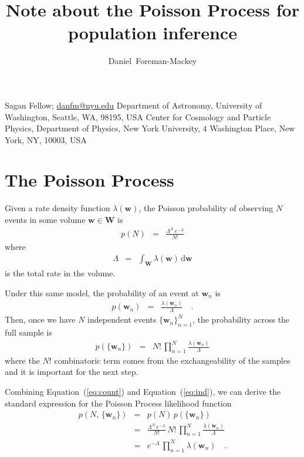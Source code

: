 \documentclass[12pt,preprint]{aastex}
\newcommand{\Eq}[1]{Equation~(\ref{eq:#1})}
\newcommand{\eq}[1]{\Eq{#1}}
\newcommand{\eqlabel}[1]{\label{eq:#1}}
\newcommand{\dd}{\ensuremath{\,\mathrm{d}}}
\newcommand{\bvec}[1]{\ensuremath{\boldsymbol{#1}}}
\newcommand{\rate}{\ensuremath{\lambda}}
\newcommand{\intrate}{\ensuremath{\Lambda}}
\begin{document}
\title{%
    Note about the Poisson Process for population inference
}

\newcommand{\uw}{2}
\newcommand{\nyu}{3}
\author{%
    Daniel~Foreman-Mackey\altaffilmark{1,\uw,\nyu}
}
         {Sagan Fellow; \url{danfm@nyu.edu}}
\altaffiltext{\uw}       {Department of Astronomy, University of Washington,
                          Seattle, WA, 98195, USA}
\altaffiltext{\nyu}      {Center for Cosmology and Particle Physics,
                          Department of Physics, New York University,
                          4 Washington Place, New York, NY, 10003, USA}

\section{The Poisson Process}

Given a rate density function $\rate(\bvec{w})$, the Poisson probability of
observing $N$ events in some volume $\bvec{w} \in \bvec{W}$ is
\begin{eqnarray}\eqlabel{count}
p(N) &=& \frac{\intrate^N\,e^{-\intrate}}{N!}
\end{eqnarray}
where
\begin{eqnarray}
\intrate &=& \int_{\bvec{W}} \rate(\bvec{w}) \dd\bvec{w}
\end{eqnarray}
is the total rate in the volume.

Under this same model, the probability of an event at $\bvec{w}_n$ is
\begin{eqnarray}
p(\bvec{w}_n) &=& \frac{\rate(\bvec{w}_n)}{\intrate} \quad.
\end{eqnarray}
Then, once we have $N$ independent events $\{\bvec{w}_n\}_{n=1}^N$, the
probability across the full sample is
\begin{eqnarray}\eqlabel{ind}
p(\{\bvec{w}_n\}) &=& N!\,\prod_{n=1}^N\frac{\rate(\bvec{w}_n)}{\intrate}
\end{eqnarray}
where the $N!$ combinatoric term comes from the exchangeability of the
samples and it is important for the next step.

Combining \eq{count} and \eq{ind}, we can derive the standard expression for
the Poisson Process likelihood function
\begin{eqnarray}
p(N,\,\{\bvec{w}_n\}) &=& p(N)\,p(\{\bvec{w}_n\}) \\
&=& \frac{\intrate^N\,e^{-\intrate}}{N!} \,
    N!\,\prod_{n=1}^N\frac{\rate(\bvec{w}_n)}{\intrate} \\
&=& e^{-\intrate} \, \prod_{n=1}^N\rate(\bvec{w}_n) \quad.
\end{eqnarray}
\end{document}
